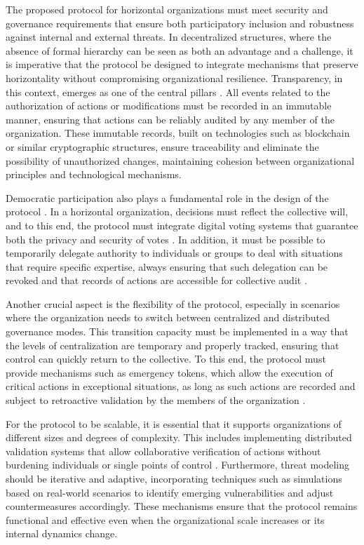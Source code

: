 The proposed protocol for horizontal organizations must meet security and
governance requirements that ensure both participatory inclusion and robustness
against internal and external threats. In decentralized structures, where the
absence of formal hierarchy can be seen as both an advantage and a challenge, it
is imperative that the protocol be designed to integrate mechanisms that
preserve horizontality without compromising organizational resilience.
Transparency, in this context, emerges as one of the central pillars
\cite{Colbac}. All events related to the authorization of actions or
modifications must be recorded in an immutable manner, ensuring that actions can
be reliably audited by any member of the organization. These immutable records,
built on technologies such as blockchain or similar cryptographic structures,
ensure traceability and eliminate the possibility of unauthorized changes,
maintaining cohesion between organizational principles and technological
mechanisms.

Democratic participation also plays a fundamental role in the design of the
protocol \cite{Colbac}. In a horizontal organization, decisions must reflect the
collective will, and to this end, the protocol must integrate digital voting
systems that guarantee both the privacy and security of votes \cite{Colbac}. In
addition, it must be possible to temporarily delegate authority to individuals
or groups to deal with situations that require specific expertise, always
ensuring that such delegation can be revoked and that records of actions are
accessible for collective audit \cite{Colbac}.

Another crucial aspect is the flexibility of the protocol, especially in
scenarios where the organization needs to switch between centralized and
distributed governance modes. This transition capacity must be implemented in a
way that the levels of centralization are temporary and properly tracked,
ensuring that control can quickly return to the collective. To this end, the
protocol must provide mechanisms such as emergency tokens, which allow the
execution of critical actions in exceptional situations, as long as such actions
are recorded and subject to retroactive validation by the members of the
organization \cite{Colbac}.

For the protocol to be scalable, it is essential that it supports organizations
of different sizes and degrees of complexity. This includes implementing
distributed validation systems that allow collaborative verification of actions
without burdening individuals or single points of control \cite{Colbac}.
Furthermore, threat modeling should be iterative and adaptive, incorporating
techniques such as simulations based on real-world scenarios to identify
emerging vulnerabilities and adjust countermeasures accordingly. These
mechanisms ensure that the protocol remains functional and effective even when
the organizational scale increases or its internal dynamics change.

